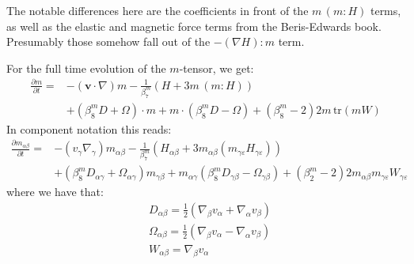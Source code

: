 \documentclass[reqno]{article}
\begin{document}
  The notable differences here are the coefficients in front of the $m \, (m:H)$
  terms, as well as the elastic and magnetic force terms from the Beris-Edwards
  book.
  Presumably those somehow fall out of the $-(\nabla H) : m$ term.

  For the full time evolution of the $m$-tensor, we get:
  \begin{equation}
    \begin{split}
    \frac{\partial m}{\partial t}
    =
    &-\left( \mathbf{v} \cdot \nabla \right) m
    - \frac{1}{\beta^m_7} \left( H + 3m \, \left( m:H \right) \right) \\
    &+ \left( \beta^m_8 D + \Omega \right) \cdot m
    + m \cdot \left( \beta^m_8 D - \Omega \right)
    + \left( \beta^m_8 - 2 \right) 2m \, \text{tr}(m W)
    \end{split}
  \end{equation}
  In component notation this reads:
  \begin{equation}
    \begin{split}
    \frac{\partial m_{\alpha\beta}}{\partial t}
    =
    &- \left( v_\gamma \nabla_\gamma \right) m_{\alpha\beta}
    - \frac{1}{\beta^m_7}
    \left(
      H_{\alpha\beta} + 3 m_{\alpha\beta} \left( m_{\gamma\varepsilon} H_{\gamma\varepsilon} \right)
    \right) \\
    &+ \left( \beta^m_8 D_{\alpha\gamma} + \Omega_{\alpha\gamma} \right) m_{\gamma\beta}
    + m_{\alpha\gamma} \left( \beta^m_8 D_{\gamma\beta} - \Omega_{\gamma\beta} \right)
    + \left(\beta^m_2 - 2\right) 2 m_{\alpha\beta} m_{\gamma\varepsilon} W_{\gamma\varepsilon}
    \end{split}
  \end{equation}
  where we have that:
  \begin{equation}
    \begin{split}
      &D_{\alpha\beta}
      = \tfrac12 \left(\nabla_\beta v_\alpha + \nabla_\alpha v_\beta \right) \\
      &\Omega_{\alpha\beta}
      = \tfrac12 \left( \nabla_\beta v_\alpha - \nabla_\alpha v_\beta \right) \\
      &W_{\alpha\beta} = \nabla_\beta v_\alpha
    \end{split}
  \end{equation}
\end{document}
